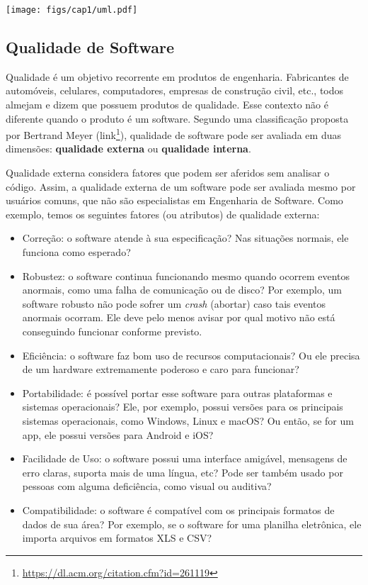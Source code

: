 \documentclass[
  11pt,
  twoside]{book}
\DeclareRobustCommand{\href}[2]{#2\footnote{\url{#1}}}
\let\origfigure\figure
\let\endorigfigure\endfigure
\renewenvironment{figure}[1][2] {
    \expandafter\origfigure\expandafter[!h]
} {
    \endorigfigure
}
\begin{document}
\begin{figure}
\centering
\texttt{[image: figs/cap1/uml.pdf]}
\caption{Exemplo de Diagrama de Classe UML}
\end{figure}

\hypertarget{qualidade-de-software}{%
\subsection{Qualidade de Software}\label{qualidade-de-software}}

 Qualidade é um objetivo recorrente em
produtos de engenharia. Fabricantes de automóveis, celulares,
computadores, empresas de construção civil, etc., todos almejam e dizem
que possuem produtos de qualidade. Esse contexto não é diferente quando
o produto é um software. Segundo uma classificação proposta por Bertrand
Meyer (\href{https://dl.acm.org/citation.cfm?id=261119}{link}),
qualidade de software pode ser avaliada em duas dimensões:
\textbf{qualidade externa} ou \textbf{qualidade interna}.

 Qualidade externa considera
fatores que podem ser aferidos sem analisar o código. Assim, a qualidade
externa de um software pode ser avaliada mesmo por usuários comuns, que
não são especialistas em Engenharia de Software. Como exemplo, temos os
seguintes fatores (ou atributos) de qualidade externa:

\begin{itemize}
\item
  Correção: o software atende à sua especificação? Nas situações
  normais, ele funciona como esperado?
\item
  Robustez: o software continua funcionando mesmo quando ocorrem eventos
  anormais, como uma falha de comunicação ou de disco? Por exemplo, um
  software robusto não pode sofrer um \emph{crash} (abortar) caso tais
  eventos anormais ocorram. Ele deve pelo menos avisar por qual motivo
  não está conseguindo funcionar conforme previsto.
\item
  Eficiência: o software faz bom uso de recursos computacionais? Ou ele
  precisa de um hardware extremamente poderoso e caro para funcionar?
\item
  Portabilidade: é possível portar esse software para outras plataformas
  e sistemas operacionais? Ele, por exemplo, possui versões para os
  principais sistemas operacionais, como Windows, Linux e macOS? Ou
  então, se for um app, ele possui versões para Android e iOS?
\item
  Facilidade de Uso: o software possui uma interface amigável, mensagens
  de erro claras, suporta mais de uma língua, etc? Pode ser também usado
  por pessoas com alguma deficiência, como visual ou auditiva?
\item
  Compatibilidade: o software é compatível com os principais formatos de
  dados de sua área? Por exemplo, se o software for uma planilha
  eletrônica, ele importa arquivos em formatos XLS e CSV?
\end{itemize}
\end{document}
